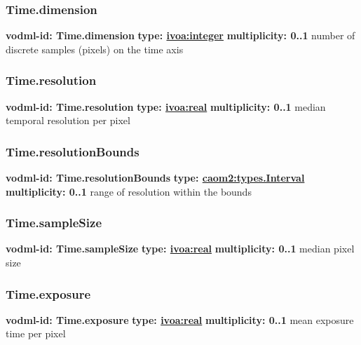     \subsubsection{Time.dimension}
      \textbf{vodml-id: Time.dimension} \newline
      \textbf{type: \hyperref[sect:ivoa]{ivoa:integer}} \newline
      \textbf{multiplicity: 0..1} \newline
      number of discrete samples (pixels) on the time axis

    \subsubsection{Time.resolution}
      \textbf{vodml-id: Time.resolution} \newline
      \textbf{type: \hyperref[sect:ivoa]{ivoa:real}} \newline
      \textbf{multiplicity: 0..1} \newline
      median temporal resolution per pixel

    \subsubsection{Time.resolutionBounds}
      \textbf{vodml-id: Time.resolutionBounds} \newline
      \textbf{type: \hyperref[sect:types.Interval]{caom2:types.Interval}} \newline
      \textbf{multiplicity: 0..1} \newline
      range of resolution within the bounds

    \subsubsection{Time.sampleSize}
      \textbf{vodml-id: Time.sampleSize} \newline
      \textbf{type: \hyperref[sect:ivoa]{ivoa:real}} \newline
      \textbf{multiplicity: 0..1} \newline
      median pixel size

    \subsubsection{Time.exposure}
      \textbf{vodml-id: Time.exposure} \newline
      \textbf{type: \hyperref[sect:ivoa]{ivoa:real}} \newline
      \textbf{multiplicity: 0..1} \newline
      mean exposure time per pixel

